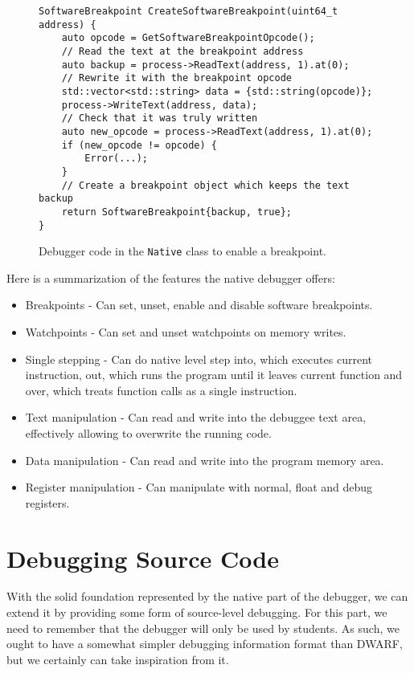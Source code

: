 \begin{figure}
    \begin{verbatim}
SoftwareBreakpoint CreateSoftwareBreakpoint(uint64_t address) {
    auto opcode = GetSoftwareBreakpointOpcode();
    // Read the text at the breakpoint address
    auto backup = process->ReadText(address, 1).at(0);
    // Rewrite it with the breakpoint opcode
    std::vector<std::string> data = {std::string(opcode)};
    process->WriteText(address, data);
    // Check that it was truly written
    auto new_opcode = process->ReadText(address, 1).at(0);
    if (new_opcode != opcode) {
        Error(...);
    }
    // Create a breakpoint object which keeps the text backup
    return SoftwareBreakpoint{backup, true};
}
    \end{verbatim}
    \caption{Debugger code in the \texttt{Native} class to enable a breakpoint.}
    \label{t86dbg:breakpoint}
\end{figure}

Here is a summarization of the features the native debugger offers:
\begin{itemize}
    \item Breakpoints - Can set, unset, enable and disable software breakpoints.
    \item Watchpoints - Can set and unset watchpoints on memory writes.
    \item Single stepping - Can do native level step into, which executes
        current instruction, out, which runs the program until it leaves
        current function and over, which treats function calls as a single
        instruction.
    \item Text manipulation - Can read and write into the debuggee text area,
        effectively allowing to overwrite the running code.
    \item Data manipulation - Can read and write into the program memory area.
    \item Register manipulation - Can manipulate with normal, float and debug registers.
\end{itemize}

\section{Debugging Source Code}\label{section:source-debugger}
With the solid foundation represented by the native part of the debugger, we
can extend it by providing some form of source-level debugging. For this part,
we need to remember that the debugger will only be used by students. As such,
we ought to have a somewhat simpler debugging information format than DWARF,
but we certainly can take inspiration from it.

